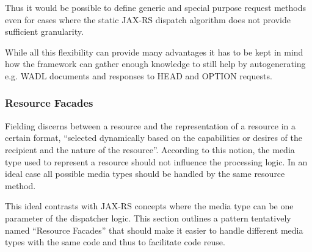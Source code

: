 \documentclass[12pt,a4paper,twoside]{scrartcl}		%
\begin{document}
Thus it would be possible to define generic and special purpose request methods
even for cases where the static JAX-RS dispatch algorithm does not provide
sufficient granularity.

While all this flexibility can provide many advantages it has to be kept in mind
how the framework can gather enough knowledge to still help by autogenerating
e.g. WADL documents and responses to HEAD and OPTION requests.

\subsubsection{Resource Facades}
\label{sec:resourcefacades}
Fielding discerns between a resource and the representation of a resource in a
certain format, ``selected dynamically based on the capabilities or desires of
the recipient and the nature of the resource''\cite[p. 87]{Fielding2000}.
According to this notion, the media type used to represent a resource should not
influence the processing logic. In an ideal case all possible media types should
be handled by the same resource method.


This ideal contrasts with JAX-RS concepts where the media type can be one
parameter of the dispatcher logic. This section outlines a pattern tentatively
named ``Resource Facades'' that should make it easier to handle different media
types with the same code and thus to facilitate code reuse.

\end{document}
